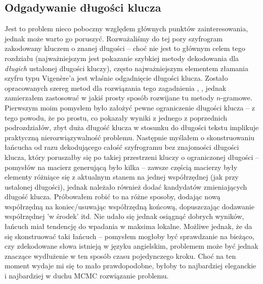\documentclass[a4paper]{article}
\theoremstyle{defn}
\theoremstyle{theorem}
\theoremstyle{lemma}
\theoremstyle{cor}
\theoremstyle{fact}
\begin{document}
\subsection{Odgadywanie długości klucza}
Jest to problem nieco poboczny względem głównych punktów zainteresowania, jednak może warto go poruszyć. Rozważaliśmy do tej pory szyfrogram zakodowany kluczem o znanej długości – choć nie jest to głównym celem tego rozdziału (najważniejszym jest pokazanie szybkiej metody dekodowania dla \textit{długich} ustalonej długości kluczy), często najważniejszym elementem złamania szyfru typu Vigenère'a jest właśnie odgadnięcie długości klucza. Zostało opracowanych szereg metod dla rozwiązania tego zagadnienia \cite{kasiski}, \cite{friedman}, jednak zamierzałem zastosować w jakiś prosty sposób rozwijane tu metody $n$-gramowe. Pierwszym moim pomysłem było założyć pewne ograniczenie długości klucza – z tego powodu, że po prostu, co pokazały wyniki z jednego z poprzednich podrozdziałów, zbyt duża długość klucza w stosunku do długości tekstu implikuje praktyczną nierozwiązywalność problemu. Następnie myślałem o skonstruowaniu łańcucha od razu dekodującego całość szyfrogramu bez znajomości długości klucza, który poruszałby się po takiej przestrzeni kluczy o ograniczonej długości – pomysłów na macierz generującą było kilka – zawsze częścią macierzy były elementy różniące się z aktualnym stanem na jednej współrzędnej (jak przy ustalonej długości), jednak należało również dodać kandydatów zmieniających długość klucza. Próbowałem robić to na różne sposoby, dodając nową współrzędną na koniec/usuwając współrzędną końcową, dopuszczając dodawanie współrzędnej 'w środek' itd. Nie udało się jednak osiągnąć dobrych wyników, łańcuch miał tendencję do wpadania w maksima lokalne. Możliwe jednak, że da się skonstruować taki łańcuch – pomysłem mogłoby być sprawdzanie na bieżąco, czy zdekodowane słowa istnieją w języku angielskim, problemem może być jednak znaczące wydłużenie w ten sposób czasu pojedynczego kroku. Choć na ten moment wydaje mi się to mało prawdopodobne, byłoby to najbardziej eleganckie i najbardziej w duchu MCMC rozwiązanie problemu. \\
\end{document}

